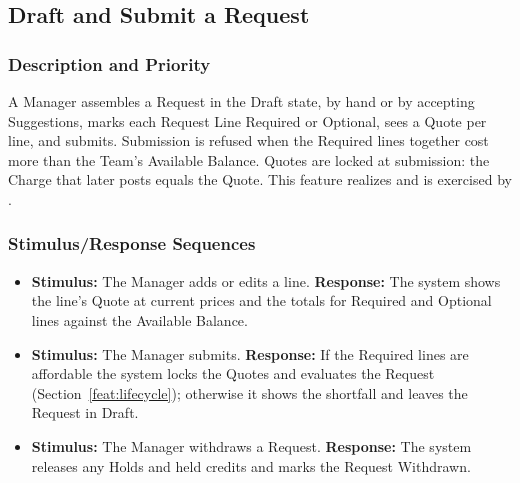 \subsection{Draft and Submit a Request}\label{feat:draft}

\subsubsection{Description and Priority}
A Manager assembles a Request in the Draft state, by hand or by accepting Suggestions, marks each Request Line Required or Optional, sees a Quote per line, and submits. Submission is refused when the Required lines together cost more than the Team's Available Balance. Quotes are locked at submission: the Charge that later posts equals the Quote. This feature realizes  and is exercised by . 

\subsubsection{Stimulus/Response Sequences}
\begin{itemize}
  \item \textbf{Stimulus:} The Manager adds or edits a line. \textbf{Response:} The system shows the line's Quote at current prices and the totals for Required and Optional lines against the Available Balance.
  \item \textbf{Stimulus:} The Manager submits. \textbf{Response:} If the Required lines are affordable the system locks the Quotes and evaluates the Request (Section~\ref{feat:lifecycle}); otherwise it shows the shortfall and leaves the Request in Draft.
  \item \textbf{Stimulus:} The Manager withdraws a Request. \textbf{Response:} The system releases any Holds and held credits and marks the Request Withdrawn.
\end{itemize}

